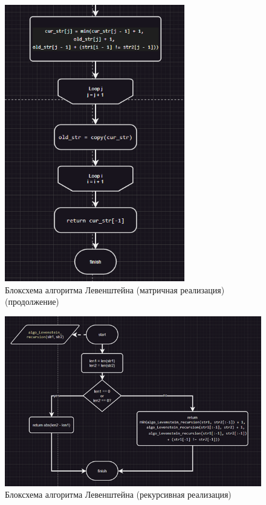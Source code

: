 \documentclass[a4paper,12pt]{article}
\begin{document}
\begin{figure}[H]
    \centering
    \includegraphics[width=0.7\textwidth]{block_1_1_2.png}
    \caption{Блоксхема алгоритма Левенштейна (матричная реализация) (продолжение)}
\end{figure}
\begin{figure}[H]
    \centering
    \includegraphics[width=1\textwidth]{block_1_2.png}
    \caption{Блоксхема алгоритма Левенштейна (рекурсивная реализация)}
\end{figure}
\end{document}
